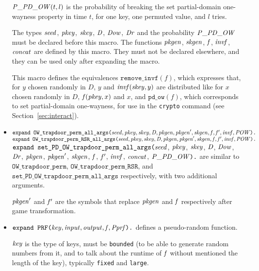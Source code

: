 \documentclass{article}
\begin{document}
\begin{itemize}
   $\mathit{P\_PD\_OW}(t,l)$ is the probability of breaking the set partial-domain one-wayness property
   in time $t$, for one key, one permuted value, and $l$ tries.

   The types $\mathit{seed}$, $\mathit{pkey}$, $\mathit{skey}$, $\mathit{D}$, $\mathit{Dow}$, $\mathit{Dr}$ 
   and the probability $\mathit{P\_PD\_OW}$ must be
   declared before this macro. The functions $\mathit{pkgen}$, $\mathit{skgen}$, $\mathit{f}$, $\mathit{invf}$, $\mathit{concat}$
   are defined by this macro. They must not be declared elsewhere, and
   they can be used only after expanding the macro. 

   This macro defines the equivalences $\texttt{remove\_invf}(f)$,
   which expresses that, for $y$ chosen randomly in $D$, $y$ and
   $\mathit{invf}(\mathit{skey}, y)$ are distributed like for $x$ chosen
   randomly in $D$, $\mathit{f}(\mathit{pkey}, x)$ and $x$, and
   $\texttt{pd\_ow}(f)$, which corresponds to set partial-domain one-wayness, for use in the
   \texttt{crypto} command (see Section~\ref{sec:interact}).

\item $\texttt{expand OW\_trapdoor\_perm\_all\_args(}\mathit{seed}, \mathit{pkey}, \mathit{skey}, \mathit{D}, \mathit{pkgen}, \mathit{pkgen}', \mathit{skgen}, \mathit{f}, \mathit{f}', \mathit{invf}, \mathit{POW}\texttt{).}$\\
$\texttt{expand OW\_trapdoor\_perm\_RSR\_all\_args(}\mathit{seed}, \mathit{pkey}, \mathit{skey}, \mathit{D}, \mathit{pkgen}, \mathit{pkgen}', \mathit{skgen}, \mathit{f}, \mathit{f}', \mathit{invf}, \mathit{POW}\texttt{).}$\\
$\texttt{expand set\_PD\_OW\_trapdoor\_perm\_all\_args(}\mathit{seed}$, $\mathit{pkey}$, $\mathit{skey}$, $\mathit{D}$, $\mathit{Dow}$, $\mathit{Dr}$, $\mathit{pkgen}$, $\mathit{pkgen}'$, $\mathit{skgen}$, $\mathit{f}$, $\mathit{f}'$, $\mathit{invf}$, $\mathit{concat}$, $\mathit{P\_PD\_OW}\texttt{).}$ are similar to $\texttt{OW\_trapdoor\_perm}$, $\texttt{OW\_trapdoor\_perm\_RSR}$, and
$\texttt{set\_PD\_OW\_trapdoor\_perm\_all\_args}$ respectively, with two additional arguments.

$\mathit{pkgen}'$ and $\mathit{f}'$ are the symbols that replace $\mathit{pkgen}$ and $\mathit{f}$ respectively after game transformation.

\item $\texttt{expand PRF(}\mathit{key}, \mathit{input}, \mathit{output}, \mathit{f}, \mathit{Pprf}\texttt{).}$ 
defines a pseudo-random function.

   $\mathit{key}$ is the type of keys, must be \texttt{bounded} (to be able to generate random numbers from it, and to talk about the runtime of $\mathit{f}$ without mentioned the length of the key), typically \texttt{fixed} and \texttt{large}.


\end{itemize}
\end{document}
